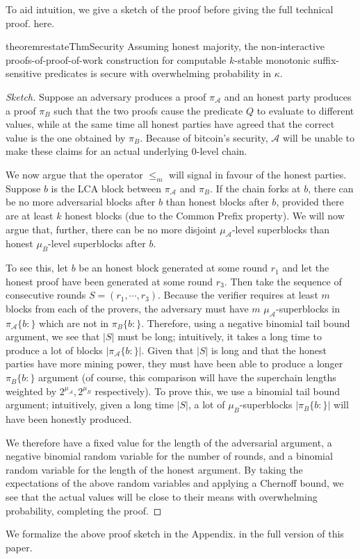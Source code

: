 To aid intuition, we give a sketch of the proof
\ifhasappendix
before giving the full technical proof.
\else
here.
\fi

\begin{restatable}[Security]{theorem}{restateThmSecurity}
    \label{thm.security}
    Assuming honest majority, the non-interactive proofs-of-proof-of-work
    construction for computable $k$-stable monotonic suffix-sensitive predicates
    is secure with overwhelming probability in $\kappa$.
\end{restatable}
\begin{proof}[Sketch]
Suppose an adversary produces a proof $\pi_\mathcal{A}$ and an honest
party produces a proof $\pi_B$ such that the two proofs cause the predicate $Q$
to evaluate to different values, while at the same time all honest parties have
agreed that the correct value is the one obtained by $\pi_B$. Because of
bitcoin's security, $\mathcal{A}$ will be unable to make these claims for an
actual underlying 0-level chain.

We now argue that the operator $\leq_m$ will
signal in favour of the honest parties.
Suppose $b$ is the LCA block between $\pi_\mathcal{A}$ and $\pi_B$. If the chain
forks at $b$, there can be no more adversarial blocks after $b$ than honest
blocks after $b$, provided there are at least $k$ honest blocks (due to the
Common Prefix property). We will now argue that, further, there can be no more
disjoint $\mu_\mathcal{A}$-level superblocks than honest $\mu_B$-level
superblocks after $b$.

To see this, let $b$ be an honest block generated at some round $r_1$ and let
the honest proof have been generated at some round $r_3$. Then take the sequence
of consecutive rounds $S = (r_1, \cdots, r_3)$. Because the verifier requires at
least $m$ blocks from each of the provers, the adversary must have $m$
$\mu_\mathcal{A}$-superblocks in $\pi_\mathcal{A}\{b:\}$ which are not in
$\pi_B\{b:\}$. Therefore, using a negative binomial tail bound argument, we see
that $|S|$ must be long; intuitively, it takes a long time to produce a lot of
blocks $|\pi_\mathcal{A}\{b:\}|$. Given that $|S|$ is long and that the honest
parties have more mining power, they must have been able to produce a longer
$\pi_B\{b:\}$ argument (of course, this comparison will have the superchain
lengths weighted by $2^{\mu_\mathcal{A}}, 2^{\mu_B}$ respectively). To prove
this, we use a binomial tail bound argument; intuitively, given a long time
$|S|$, a lot of $\mu_B$-superblocks $|\pi_B\{b:\}|$ will have been honestly
produced.

We therefore have a fixed value for the length of the adversarial argument, a
negative binomial random variable for the number of rounds, and a binomial
random variable for the length of the honest argument. By taking the
expectations of the above random variables and applying a Chernoff bound, we see
that the actual values will be close to their means with overwhelming
probability, completing the proof.
\Qed
\end{proof}

We formalize the above proof sketch
\ifhasappendix
in the Appendix.
\else
in the full version of this paper.
\fi
